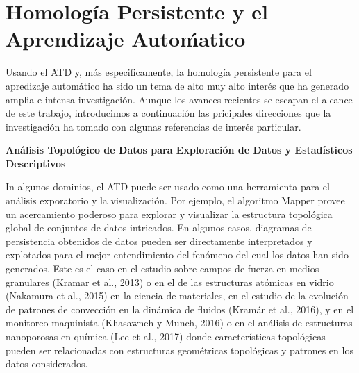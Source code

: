 \section{Homolog\'ia Persistente y el Aprendizaje Auto\'matico}

Usando el ATD y, m\'as especificamente, la homolog\'ia persistente para el
apredizaje autom\'atico ha sido un tema de alto muy alto inter\'es que ha
generado amplia e intensa investigaci\'on.
Aunque los avances recientes se escapan el alcance de este trabajo,
introducimos a continuaci\'on las pricipales direcciones que la investigaci\'on
ha tomado con algunas referencias de inter\'es particular. \medskip\medskip

\textbf{\large An\'alisis Topol\'ogico de Datos para
Exploraci\'on de Datos y Estad\'isticos Descriptivos}

In algunos dominios, el ATD puede ser usado como una herramienta para el an\'alisis exporatorio
y la visualizaci\'on.
Por ejemplo, el algoritmo Mapper provee un acercamiento poderoso para explorar y visualizar
la estructura topol\'ogica global de conjuntos de datos intricados.
En algunos casos, diagramas de persistencia obtenidos de datos pueden ser directamente
interpretados y explotados para el mejor entendimiento del fen\'omeno del cual los
datos han sido generados.
Este es el caso en el estudio sobre campos de fuerza en medios granulares
(Kramar et al., 2013\cite{Kramar2013}) o en el de las estructuras at\'omicas en vidrio
(Nakamura et al., 2015\cite{Nakamura2015}) en la ciencia de materiales,
en el estudio de la evoluci\'on de patrones de convecci\'on en la din\'amica de fluidos
(Kram\'ar et al., 2016\cite{Kramar2016}), y en el monitoreo maquinista
(Khasawneh y Munch, 2016\cite{Khasawneh2016}) o en el an\'alisis de estructuras
nanoporosas en qu\'imica (Lee et al., 2017\cite{Lee2017}) donde caracter\'isticas
topol\'ogicas pueden ser relacionadas con estructuras geom\'etricas topol\'ogicas
y patrones en los datos considerados.
